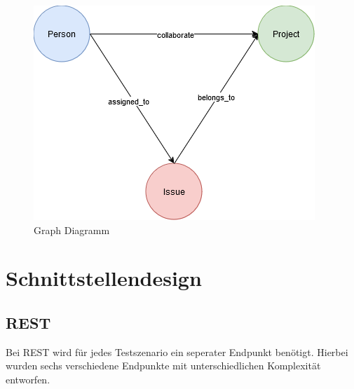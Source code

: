 \begin{figure}[H]
	\centering
	\includegraphics[scale=.8]{Illustrations/graph_diagram}
	\caption{Graph Diagramm}
\end{figure}


\section{Schnittstellendesign} %
\label{sec:schnittstellendesign}

\subsection{REST}
\label{sec:rest}
Bei REST wird für jedes Testszenario ein seperater Endpunkt benötigt. Hierbei wurden sechs verschiedene Endpunkte mit unterschiedlichen Komplexität entworfen.

